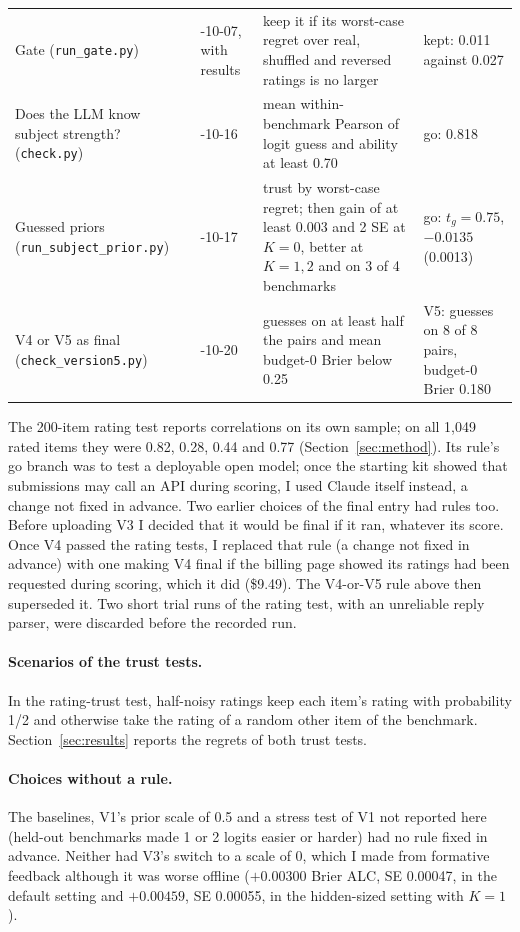 \begin{table}[h]
\begin{tabular}{>{\raggedright\arraybackslash}p{3.6cm}>{\raggedright\arraybackslash}p{1.75cm}>{\raggedright\arraybackslash}p{4.2cm}>{\raggedright\arraybackslash}p{3.05cm}}
    Gate (\texttt{run\_gate.py}) & 2026-10-07, with results & keep it if its worst-case regret over real, shuffled and reversed ratings is no larger & kept: 0.011 against 0.027 \\
    Does the LLM know subject strength? (\texttt{check.py}) & 2026-10-16 & mean within-benchmark Pearson of logit guess and ability at least 0.70 & go: 0.818 \\
    Guessed priors \newline (\texttt{run\_subject\_prior.py}) & 2026-10-17 & trust by worst-case regret; then gain of at least 0.003 and 2 SE at $K = 0$, better at $K = 1, 2$ and on 3 of 4 benchmarks & go: $t_g = 0.75$, $-0.0135$ (0.0013) \\
    V4 or V5 as final (\texttt{check\_version5.py}) & 2026-10-20 & guesses on at least half the pairs and mean budget-0 Brier below 0.25 & V5: guesses on 8 of 8 pairs, budget-0 Brier 0.180 \\
    \bottomrule
  \end{tabular}
\end{table}

The 200-item rating test reports correlations on its own sample; on all 1,049 rated items they were 0.82, 0.28, 0.44 and 0.77 (Section~\ref{sec:method}). Its rule's go branch was to test a deployable open model; once the starting kit showed that submissions may call an API during scoring, I used Claude itself instead, a change not fixed in advance. Two earlier choices of the final entry had rules too. Before uploading V3 I decided that it would be final if it ran, whatever its score. Once V4 passed the rating tests, I replaced that rule (a change not fixed in advance) with one making V4 final if the billing page showed its ratings had been requested during scoring, which it did (\$9.49). The V4-or-V5 rule above then superseded it. Two short trial runs of the rating test, with an unreliable reply parser, were discarded before the recorded run.

\paragraph{Scenarios of the trust tests.}
In the rating-trust test, half-noisy ratings keep each item's rating with probability 1/2 and otherwise take the rating of a random other item of the benchmark. Section~\ref{sec:results} reports the regrets of both trust tests.

\paragraph{Choices without a rule.}
The baselines, V1's prior scale of 0.5 and a stress test of V1 not reported here (held-out benchmarks made 1 or 2 logits easier or harder) had no rule fixed in advance. Neither had V3's switch to a scale of 0, which I made from formative feedback although it was worse offline ($+0.00300$ Brier ALC, SE 0.00047, in the default setting and $+0.00459$, SE 0.00055, in the hidden-sized setting with $K=1$).

